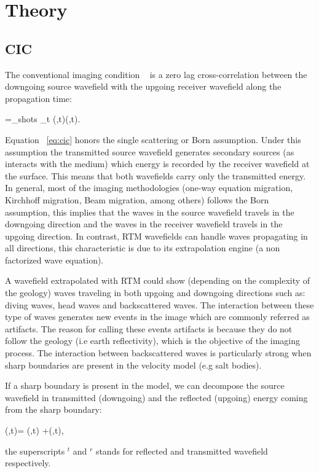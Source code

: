 \section{Theory}

\subsection{CIC}
The conventional imaging condition ~\citep{claerbout:467}
is a zero lag cross-correlation between the downgoing source wavefield with the upgoing 
receiver wavefield along the propagation time:

\beq
\R=\sum_{shots} \sum_{t} \US(\xx,t)\UR(\xx,t).
\label{eq:cic}
\eeq

Equation ~\ref{eq:cic} honors the single scattering or Born assumption. Under this assumption the transmitted
source wavefield generates secondary sources (as interacts with the medium) which energy is recorded by the 
receiver wavefield at the surface. This means that both wavefields carry only the transmitted energy. In general,
 most of the imaging methodologies (one-way equation migration, Kirchhoff migration, Beam migration, among others)
follows the Born assumption, this implies that the waves in the source wavefield travels in the downgoing 
direction and the waves in the receiver wavefield travels in the upgoing direction. In contrast, RTM wavefields
can handle waves propagating in all directions, this characteristic is due to its extrapolation engine
(a non factorized wave equation).

A wavefield extrapolated with RTM could show (depending on the complexity of the geology) waves traveling in both
upgoing and downgoing directions such as: diving waves, head waves and backscattered waves. The interaction between
 these type of waves generates new events in the image which are commonly referred as artifacts. The reason for calling
 these events artifacts is because they do not follow the geology (i.e earth reflectivity), which is the objective 
of the imaging process. The interaction between backscattered waves is particularly strong when
sharp boundaries are present in the velocity model (e.g salt bodies).

If a sharp boundary is present in the model, we can decompose the source wavefield in transmitted (downgoing) 
 and the reflected (upgoing) energy coming from the sharp boundary:

\beq
\US(\xx,t)= \USr(\xx,t) +\USt(\xx,t),
\label{eq:ssplit}
\eeq

the superscripts $^t$ and $^r$ stands for reflected and transmitted wavefield respectively. 

